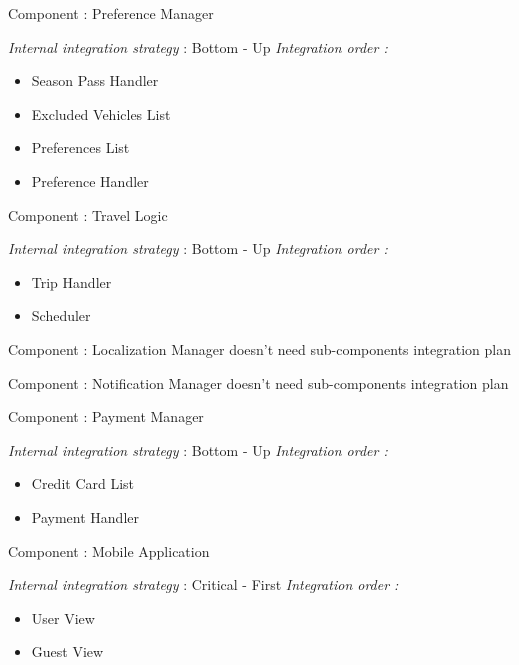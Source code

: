 Component : Preference Manager

\textit{Internal integration strategy} : Bottom - Up
\textit{Integration order :}
	\begin{itemize}
		\item Season Pass Handler
		\item Excluded Vehicles List
		\item Preferences List
		\item Preference Handler
	\end{itemize}
	

Component : Travel Logic

\textit{Internal integration strategy} : Bottom - Up
\textit{Integration order :}
	\begin{itemize}
		\item Trip Handler
		\item Scheduler
	\end{itemize}
	
Component : Localization Manager doesn't need sub-components integration plan

Component : Notification Manager doesn't need sub-components integration plan

Component : Payment Manager

\textit{Internal integration strategy} : Bottom - Up
\textit{Integration order :}
	\begin{itemize}
		\item Credit Card List
		\item Payment Handler
	\end{itemize}

Component : Mobile Application

\textit{Internal integration strategy} : Critical - First
\textit{Integration order :}
	\begin{itemize}
		\item User View
		\item Guest View
	\end{itemize}
	
